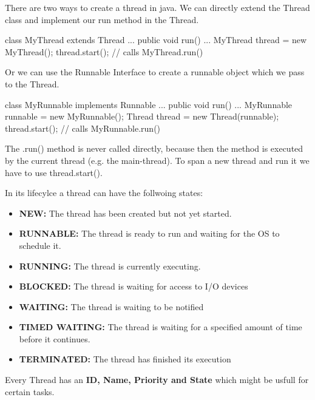 There are two ways to create a thread in java. We can directly extend the Thread class and implement our run method in the Thread.

\begin{codeexample}
class MyThread extends Thread { 
    ...
    public void run() {
        ...
    }
}
MyThread thread = new MyThread();
thread.start(); // calls MyThread.run()
\end{codeexample}

Or we can use the Runnable Interface to create a runnable object which we pass to the Thread.

\begin{codeexample}
class MyRunnable implements Runnable { 
    ...
    public void run() {
        ...
    }
}
MyRunnable runnable = new MyRunnable();
Thread thread = new Thread(runnable);
thread.start(); // calls MyRunnable.run()
\end{codeexample}

\begin{remark}
    The .run() method is never called directly, because then the method is executed by the current thread (e.g. the main-thread). To span a new thread and run it we have to use thread.start().
\end{remark}

In its lifecylce a thread can have the follwoing states:
\begin{itemize}
    \item \textbf{NEW: }The thread has been created but not yet started.
    \item \textbf{RUNNABLE: }The thread is ready to run and waiting for the OS to schedule it.
    \item \textbf{RUNNING: }The thread is currently executing.
    \item \textbf{BLOCKED: }The thread is waiting for access to I/O devices
    \item \textbf{WAITING: }The thread is waiting to be notified
    \item \textbf{TIMED WAITING: }The thread is waiting for a specified amount of time before it continues.
    \item \textbf{TERMINATED: }The thread has finished its execution
\end{itemize}

\begin{remark}
    Every Thread has an \textbf{ID, Name, Priority and State} which might be usfull for certain tasks.
\end{remark}

